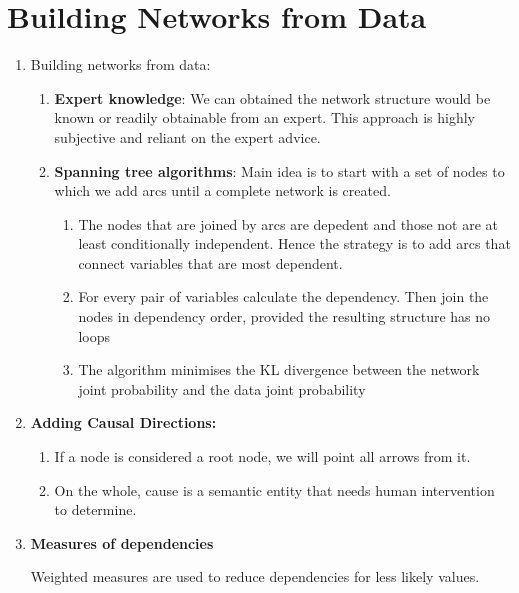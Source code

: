 \documentclass[12pt,twoside]{article}
\begin{document}
\newpage

\section{Building Networks from Data}

\begin{enumerate}
\item Building networks from data:
\begin{enumerate}
\item \textbf{Expert knowledge}: We can obtained the network structure would be known or readily obtainable from an expert. This approach is highly subjective and reliant on the expert advice.
\item \textbf{Spanning tree algorithms}: Main idea is to start with a set of nodes to which we add arcs until a complete network is created.
\begin{enumerate}
\item The nodes that are joined by arcs are depedent and those not are at least conditionally independent. Hence the strategy is to add arcs that connect variables that are most dependent.
\item For every pair of variables calculate the dependency. Then join the nodes in dependency order, provided the resulting structure has no loops
\item The algorithm minimises the KL divergence between the network joint probability and the data joint probability
\end{enumerate}
\end{enumerate}

\item \textbf{Adding Causal Directions:}
\begin{enumerate}
\item If a node is considered a root node, we will point all arrows from it. 
\item On the whole, cause is a semantic entity that needs human intervention to determine.
\end{enumerate}


\item \textbf{Measures of dependencies}

    Weighted measures are used to reduce dependencies for less likely values.
        

\end{enumerate}
\end{document}
